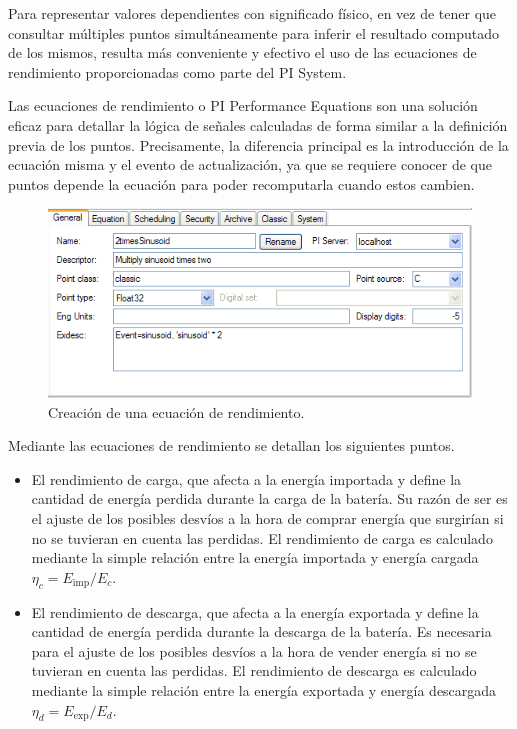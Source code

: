 Para representar valores dependientes con significado físico, en vez de tener que consultar múltiples puntos simultáneamente para inferir el resultado computado de los mismos, resulta más conveniente y efectivo el uso de las ecuaciones de rendimiento proporcionadas como parte del PI System.

Las ecuaciones de rendimiento o PI Performance Equations son una solución eficaz para detallar la lógica de señales calculadas de forma similar a la definición previa de los puntos. Precisamente, la diferencia principal es la introducción de la ecuación misma y el evento de actualización, ya que se requiere conocer de que puntos depende la ecuación para poder recomputarla cuando estos cambien.

\begin{figure}
  \centering
  \includegraphics[width=0.5\linewidth]{figures/ecuaciones-de-rendimiento.png}
  \caption[Creación de una ecuación de rendimiento.]{Creación de una ecuación de rendimiento.}%
  \label{fig:ecuaciones-de-rendimiento}
\end{figure}

Mediante las ecuaciones de rendimiento se detallan los siguientes puntos.

\begin{itemize}

  \item El rendimiento de carga, que afecta a la energía importada y define la cantidad de energía perdida durante la carga de la batería. Su razón de ser es el ajuste de los posibles desvíos a la hora de comprar energía que surgirían si no se tuvieran en cuenta las perdidas. El rendimiento de carga es calculado mediante la simple relación entre la energía importada y energía cargada \( \eta_{c} = E_{\text{imp}} / E_{c} \).

  \item El rendimiento de descarga, que afecta a la energía exportada y define la cantidad de energía perdida durante la descarga de la batería. Es necesaria para el ajuste de los posibles desvíos a la hora de vender energía si no se tuvieran en cuenta las perdidas. El rendimiento de descarga es calculado mediante la simple relación entre la energía exportada y energía descargada \( \eta_{d} = E_{\text{exp}} / E_{d} \).

\end{itemize}

